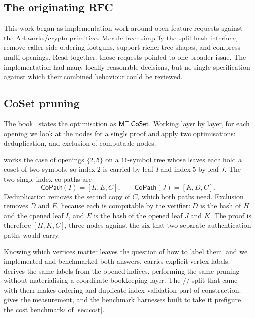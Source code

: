
\subsection{The originating RFC}
\label{app:rfc}

This work began as implementation work around open feature requests against the
\textsf{Arkworks/crypto-primitives} Merkle tree: simplify the split hash interface, remove
caller-side ordering footguns, support richer tree shapes, and compress multi-openings.
Read together, those requests pointed to one broader issue.  The implementation had many
locally reasonable decisions, but no single specification against which their combined
behaviour could be reviewed.

\subsection{CoSet pruning}
\label{app:coset}

The book~\cite{CY26} states the optimisation as $\mathsf{MT}.\mathsf{CoSet}$.  Working layer
by layer, for each opening we look at the nodes for a single proof and apply two
optimisations: deduplication, and exclusion of computable nodes.

 works the case of openings $\{2,5\}$ on a $16$-symbol tree whose
leaves each hold a coset of two symbols, so index $2$ is carried by leaf $I$ and index $5$
by leaf $J$.  The two single-index co-paths are
\[
  \mathsf{CoPath}(I)=[H,E,C],\qquad \mathsf{CoPath}(J)=[K,D,C].
\]
Deduplication removes the second copy of $C$, which both paths need.  Exclusion removes
$D$ and $E$, because each is computable by the verifier: $D$ is the hash of $H$ and the
opened leaf $I$, and $E$ is the hash of the opened leaf $J$ and $K$.  The proof is
therefore $[H,K,C]$, three nodes against the six that two separate authentication paths
would carry.

Knowing which vertices matter leaves the question of how to label them, and we
implemented and benchmarked both answers.   carries explicit vertex labels.
 derives the same labels from the opened indices, performing the same
pruning without materialising a coordinate bookkeeping layer.  The
// split that came with them makes
ordering and duplicate-index validation part of construction.
 gives the measurement, and the benchmark harnesses built to
take it prefigure the cost benchmarks of \cref{sec:cost}.

